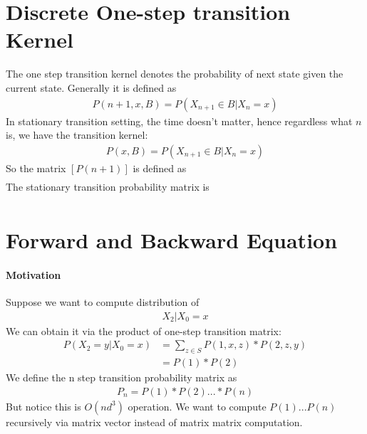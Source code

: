 \section{Discrete One-step transition Kernel} 
The one step transition kernel denotes the probability of next state given the current state. Generally it is defined as 
    \begin{align*}
        P(n+1, x, B) = P(X_{n+1} \in B|X_n = x)
    \end{align*}
In stationary transition setting, the time doesn't matter, hence regardless what $n$ is, we have the transition kernel: 
    \begin{align*}
        P(x, B) = P(X_{n+1} \in B | X_n = x)
    \end{align*}
So the matrix $[P(n+1)]$ is defined as 
    \begin{align*}
        [P(n+1, x, y) : x,y\in S]
    \end{align*}
The stationary transition probability matrix is 
    \begin{align*}
        [P(x,y):x,y \in S]
    \end{align*}

\section{Forward and Backward Equation} 
\paragraph{Motivation} Suppose we want to compute distribution of 
    \begin{align*}
        X_2 | X_0 = x
    \end{align*}
We can obtain it via the product of one-step transition matrix: 
    \begin{align*}
        P(X_2 = y | X_0 = x) 
        & = \sum_{z\in S} P(1, x, z) * P(2, z, y) \\
        & = P(1) * P(2) \tag{$P^2$ if process is stationary} 
    \end{align*}
We define the n step transition probability matrix as 
    \begin{align*}
        P_n = P(1) * P(2) ... * P(n)
    \end{align*}
But notice this is $O(nd^3)$ operation. We want to compute $P(1)...P(n)$ recursively via matrix vector instead of matrix matrix computation. 

